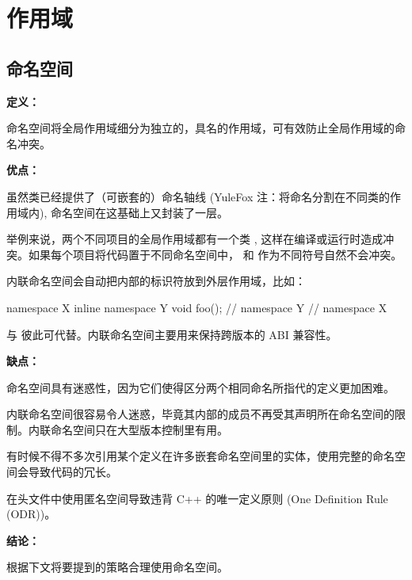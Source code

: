\chapter{作用域}

\section{命名空间} \label{qt-namespace}


\textbf{定义：}

命名空间将全局作用域细分为独立的，具名的作用域，可有效防止全局作用域的命名冲突。

\textbf{优点：}

虽然类已经提供了（可嵌套的）命名轴线 (YuleFox 注：将命名分割在不同类的作用域内), 命名空间在这基础上又封装了一层。

举例来说，两个不同项目的全局作用域都有一个类 , 这样在编译或运行时造成冲突。如果每个项目将代码置于不同命名空间中，
 和  作为不同符号自然不会冲突。

内联命名空间会自动把内部的标识符放到外层作用域，比如：

\begin{cppcode}
namespace X {
inline namespace Y {
  void foo();
}  // namespace Y
}  // namespace X
\end{cppcode}

 与  彼此可代替。内联命名空间主要用来保持跨版本的 ABI 兼容性。

\textbf{缺点：}

命名空间具有迷惑性，因为它们使得区分两个相同命名所指代的定义更加困难。

内联命名空间很容易令人迷惑，毕竟其内部的成员不再受其声明所在命名空间的限制。内联命名空间只在大型版本控制里有用。

有时候不得不多次引用某个定义在许多嵌套命名空间里的实体，使用完整的命名空间会导致代码的冗长。

在头文件中使用匿名空间导致违背 C++ 的唯一定义原则 (One Definition Rule (ODR))。

\textbf{结论：}

根据下文将要提到的策略合理使用命名空间。

